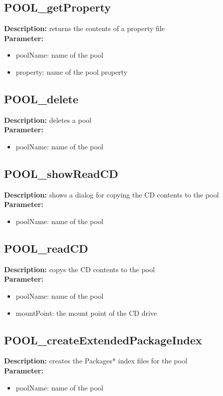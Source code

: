 \subsection{POOL\_getProperty}
\textbf{Description:} returns the contents of a property file\\
\textbf{Parameter:}
\begin{itemize}
\item poolName: name of the pool
\item property: name of the pool property
\end{itemize}

\subsection{POOL\_delete}
\textbf{Description:} deletes a pool\\
\textbf{Parameter:}
\begin{itemize}
\item poolName: name of the pool
\end{itemize}

\subsection{POOL\_showReadCD}
\textbf{Description:} shows a dialog for copying the CD contents to the pool\\
\textbf{Parameter:}
\begin{itemize}
\item poolName: name of the pool
\end{itemize}

\subsection{POOL\_readCD}
\textbf{Description:} copys the CD contents to the pool\\
\textbf{Parameter:}
\begin{itemize}
\item poolName: name of the pool
\item mountPoint: the mount point of the CD drive
\end{itemize}

\subsection{POOL\_createExtendedPackageIndex}
\textbf{Description:} creates the Packages* index files for the pool\\
\textbf{Parameter:}
\begin{itemize}
\item poolName: name of the pool
\end{itemize}

